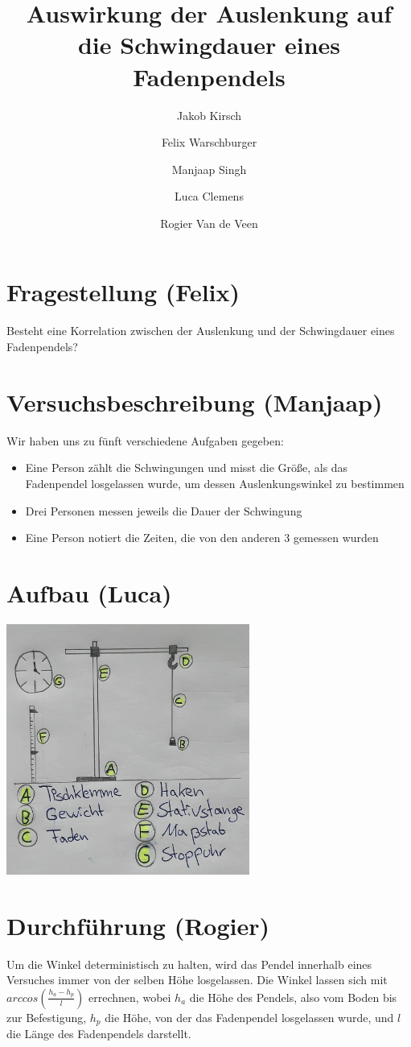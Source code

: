 \documentclass[8pt, letterpaper]{article}
\title{Auswirkung der Auslenkung auf die Schwingdauer eines Fadenpendels}
\author{
	Jakob Kirsch \and
	Felix Warschburger \and
	Manjaap Singh \and
	Luca Clemens \and
	Rogier Van de Veen
}
\begin{document}
\maketitle

\section{Fragestellung (Felix)}
Besteht eine Korrelation zwischen der Auslenkung und der Schwingdauer eines Fadenpendels?

\section{Versuchsbeschreibung (Manjaap)}
Wir haben uns zu fünft verschiedene Aufgaben gegeben:
\begin{itemize}
  \item Eine Person zählt die Schwingungen und misst die Größe, als das Fadenpendel losgelassen wurde, um dessen Auslenkungswinkel zu bestimmen
  \item Drei Personen messen jeweils die Dauer der Schwingung
  \item Eine Person notiert die Zeiten, die von den anderen 3 gemessen wurden
\end{itemize}

\section{Aufbau (Luca)}
\begin{center}
  \includegraphics[width=8cm]{image1}
\end{center}

\section{Durchführung (Rogier)}
Um die Winkel deterministisch zu halten, wird das Pendel innerhalb eines Versuches immer von der selben Höhe losgelassen.
Die Winkel lassen sich mit $arccos(\frac{h_a - h_p}{l})$ errechnen, wobei $h_a$ die Höhe des Pendels, also vom Boden bis zur Befestigung, $h_p$ die Höhe, von der das Fadenpendel losgelassen wurde, und $l$ die Länge des Fadenpendels darstellt.
\end{document}
